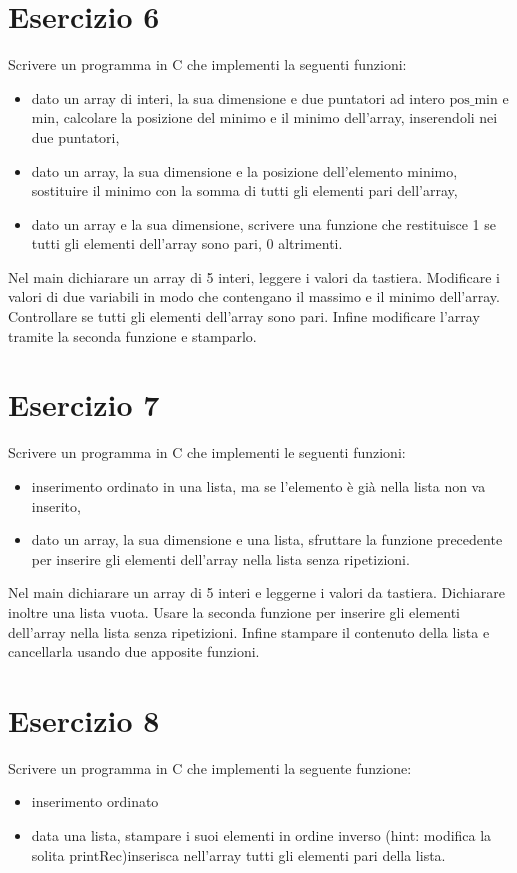 \documentclass[italian,oneside,headinclude,10pt]{scrartcl}
\begin{document}
\section{Esercizio 6}
Scrivere un programma in C che implementi la seguenti funzioni:
\begin{itemize} 
    \item dato un array di interi, la sua dimensione e due puntatori ad intero $\textrm{pos_min}$ e $\textrm{min}$, calcolare la posizione del minimo e il minimo dell'array, inserendoli nei due puntatori,
    \item dato un array, la sua dimensione  e la posizione dell'elemento minimo, sostituire il minimo con la somma di tutti gli elementi pari dell'array,
    \item dato un array e la sua dimensione, scrivere una funzione che restituisce 1 se tutti gli elementi dell'array sono pari, 0 altrimenti.
\end{itemize}

Nel main dichiarare un array di 5 interi, leggere i valori da tastiera. Modificare i valori di due variabili in modo che contengano il massimo e il minimo dell'array. Controllare se tutti gli elementi dell'array sono pari. Infine modificare l'array tramite la seconda funzione e stamparlo.

\section{Esercizio 7}
Scrivere un programma in C che implementi le seguenti funzioni:
\begin{itemize}
    \item inserimento ordinato in una lista, ma se l'elemento è già nella lista non va inserito,
    \item dato un array, la sua dimensione e una lista, sfruttare la funzione precedente per inserire gli elementi dell'array nella lista senza ripetizioni.
\end{itemize}

Nel main dichiarare un array di 5 interi e leggerne i valori da tastiera. Dichiarare inoltre una lista vuota. Usare la seconda funzione per inserire gli elementi dell'array nella lista senza ripetizioni. Infine stampare il contenuto della lista e cancellarla usando due apposite funzioni.

\section{Esercizio 8}
Scrivere un programma in C che implementi la seguente funzione:
\begin{itemize}
    \item inserimento ordinato
    \item data una lista, stampare i suoi elementi in ordine inverso (hint: modifica la solita printRec)inserisca nell'array tutti gli elementi pari della lista.
\end{itemize}
\end{document}
